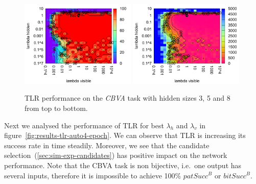 \begin{figure}[H]
  \includegraphics[width=0.49\textwidth]{img/k3/tlr-8-success.pdf} 
  \includegraphics[width=0.49\textwidth]{img/k3/tlr-8-epoch.pdf}    
  \caption{TLR performance on the \emph{CBVA} task with hidden sizes 3, 5 and 8 from top to bottom.}
  \label{fig:results-tlr-k3-performance}
\end{figure}

Next we analysed the performance of TLR for best $\lambda_h$ and $\lambda_v$ in figure~\ref{fig:results-tlr-auto4-epoch}. We can observe that TLR is increasing its success rate in time steadily. Moreover, we see that the candidate selection~(\ref{sec:sim-exp-candidates}) has positive impact on the network performance.
Note that the CBVA task is non bijective, i.e.~one output has several inputs, therefore it is impossible to achieve 100\% $patSucc^B$ or $bitSucc^B$. 


